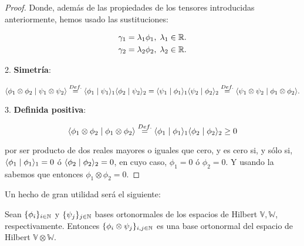 \begin{proof}
    Donde, además de las propiedades de los tensores introducidas anteriormente, hemos usado las sustituciones:

    \begin{equation}
    \begin{split}
        \gamma_1 &= \lambda_1 \phi_1, \; \lambda_1 \in \R. \\
        \gamma_2 &= \lambda_2 \phi_2, \; \lambda_2 \in \R. \\
    \end{split}
    \end{equation}

    2. \textbf{Simetría}:

    \begin{equation}
        \innerproduct{\phi_1 \otimes \phi_2}{\psi_1 \otimes \psi_2} \encima{=}{Def.} \innerproduct{\phi_1}{\psi_1}_1 \innerproduct{\phi_2}{\psi_2}_2 =  \innerproduct{\psi_1}{\phi_1}_1 \innerproduct{\psi_2}{\phi_2}_2 \encima{=}{Def.} \innerproduct{\psi_1 \otimes \psi_2}{\phi_1 \otimes \phi_2}.
    \end{equation}

    3. \textbf{Definida positiva}:

    \begin{equation}
        \innerproduct{\phi_1 \otimes \phi_2}{\phi_1 \otimes \phi_2} \encima{=}{Def.} \innerproduct{\phi_1}{\phi_1}_1 \innerproduct{\phi_2}{\phi_2}_2 \geq 0
    \end{equation}

    por ser producto de dos reales mayores o iguales que cero, y es cero si, y sólo si, $\innerproduct{\phi_1}{\phi_1}_1 = 0$ ó $\innerproduct{\phi_2}{\phi_2}_2 = 0$, en cuyo caso, $\phi_1 = 0$ ó $\phi_2 = 0$. Y usando la  sabemos que entonces $\phi_1 \otimes \phi_2 = 0$.

\end{proof}

Un hecho de gran utilidad será el siguiente:

\begin{proposicion} \label{prop:base_ortonormal_prod_tensorial}
    Sean $\conjunto{\phi_i}_{i \in \N}$ y $\conjunto{\psi_j}_{j \in \N}$ bases ortonormales de los espacios de Hilbert $\mathbb{V}, \mathbb{W}$, respectivamente. Entonces $\conjunto{\phi_i \otimes \psi_j}_{i, j \in \N}$ es una base ortonormal del espacio de Hilbert $\mathbb{V} \otimes \mathbb{W}$.
\end{proposicion}

